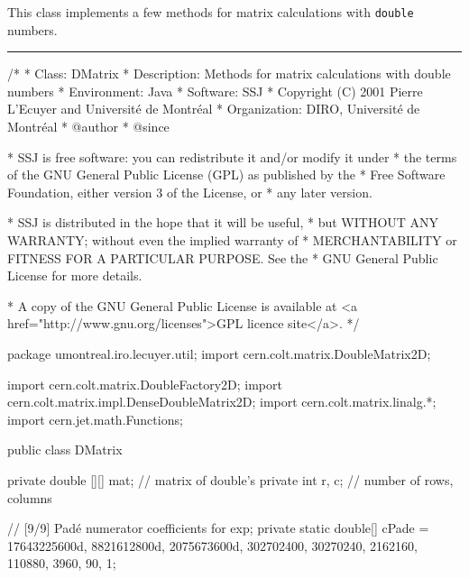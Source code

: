 
This class implements a few methods for matrix calculations
with \texttt{double} numbers.

\bigskip\hrule

\begin{code}\begin{hide}
/*
 * Class:        DMatrix
 * Description:  Methods for matrix calculations with double numbers
 * Environment:  Java
 * Software:     SSJ
 * Copyright (C) 2001  Pierre L'Ecuyer and Université de Montréal
 * Organization: DIRO, Université de Montréal
 * @author
 * @since

 * SSJ is free software: you can redistribute it and/or modify it under
 * the terms of the GNU General Public License (GPL) as published by the
 * Free Software Foundation, either version 3 of the License, or
 * any later version.

 * SSJ is distributed in the hope that it will be useful,
 * but WITHOUT ANY WARRANTY; without even the implied warranty of
 * MERCHANTABILITY or FITNESS FOR A PARTICULAR PURPOSE.  See the
 * GNU General Public License for more details.

 * A copy of the GNU General Public License is available at
   <a href="http://www.gnu.org/licenses">GPL licence site</a>.
 */
\end{hide}
package umontreal.iro.lecuyer.util;
   import cern.colt.matrix.DoubleMatrix2D;\begin{hide}
   import cern.colt.matrix.DoubleFactory2D;
   import cern.colt.matrix.impl.DenseDoubleMatrix2D;
   import cern.colt.matrix.linalg.*;
   import cern.jet.math.Functions;\end{hide}


public class DMatrix \begin{hide} {
   private double [][] mat;        // matrix of double's
   private int r, c;               // number of rows, columns

   // [9/9] Padé numerator coefficients for exp;
   private static double[] cPade = {17643225600d, 8821612800d, 2075673600d,
       302702400, 30270240,  2162160, 110880, 3960, 90, 1};

}
\end{hide}
\end{code}
